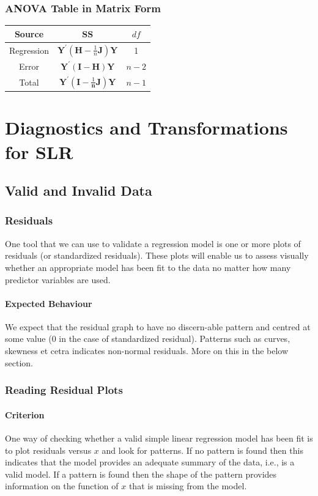 \documentclass[11pt]{article}
\begin{document}
\subsubsection{ANOVA Table in Matrix Form}
\begin{center}
    \begin{tabular}{|c||c|c|}
        \hline
        Source & SS & $df$ \\ \hline
        Regression & $\mathbf{Y}^{\prime}\left(\mathbf{H}-\frac{1}{n} \mathbf{J}\right) \mathbf{Y}$ & 1 \\ \hline
        Error & $\mathbf{Y}^{\prime}(\mathbf{I}-\mathbf{H}) \mathbf{Y}$ & $n-2$ \\ \hline
        Total & $\mathbf{Y}^{\prime}\left(\mathbf{I}-\frac{1}{\mathbf{n}} \mathbf{J}\right) \mathbf{Y}$ & $n-1$ \\ \hline
    \end{tabular}
\end{center}


\section{Diagnostics and Transformations for SLR}
\subsection{Valid and Invalid Data}
\subsubsection{Residuals}
One tool that we can use to validate a regression model is one or more plots of residuals (or standardized residuals). These plots will enable us to assess visually whether an appropriate model has been fit to the data no matter how many predictor variables are used. 

\paragraph{Expected Behaviour} We expect that the residual graph to have no discern-able pattern and centred at some value (0 in the case of standardized residual). Patterns such as curves, skewness et cetra indicates non-normal residuals. More on this in the below section.

\subsubsection{Reading Residual Plots}
\paragraph{Criterion} One way of checking whether a valid simple linear regression model has been fit is to plot residuals versus $x$ and look for patterns. If no pattern is found then this indicates that the model provides an adequate summary of the data, i.e., is a valid model. If a pattern is found then the shape of the pattern provides information on the function of $x$ that is missing from the model.  
\end{document}
